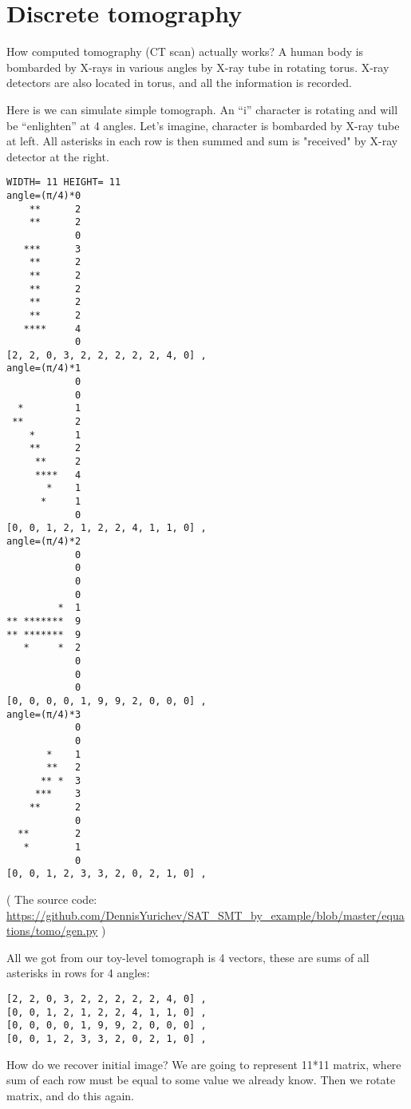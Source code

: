 \section{Discrete tomography}

How computed tomography (CT scan) actually works?
A human body is bombarded by X-rays in various angles by X-ray tube in rotating torus.
X-ray detectors are also located in torus, and all the information is recorded.

Here is we can simulate simple tomograph.
An ``i'' character is rotating and will be ``enlighten'' at 4 angles.
Let's imagine, character is bombarded by X-ray tube at left.
All asterisks in each row is then summed and sum is "received" by X-ray detector at the right.

\begin{lstlisting}
WIDTH= 11 HEIGHT= 11
angle=(π/4)*0
    **      2
    **      2
            0
   ***      3
    **      2
    **      2
    **      2
    **      2
    **      2
   ****     4
            0
[2, 2, 0, 3, 2, 2, 2, 2, 2, 4, 0] ,
angle=(π/4)*1
            0
            0
  *         1
 **         2
    *       1
    **      2
     **     2
     ****   4
       *    1
      *     1
            0
[0, 0, 1, 2, 1, 2, 2, 4, 1, 1, 0] ,
angle=(π/4)*2
            0
            0
            0
            0
         *  1
** *******  9
** *******  9
   *     *  2
            0
            0
            0
[0, 0, 0, 0, 1, 9, 9, 2, 0, 0, 0] ,
angle=(π/4)*3
            0
            0
       *    1
       **   2
      ** *  3
     ***    3
    **      2
            0
  **        2
   *        1
            0
[0, 0, 1, 2, 3, 3, 2, 0, 2, 1, 0] ,
\end{lstlisting}

( The source code: \url{https://github.com/DennisYurichev/SAT_SMT_by_example/blob/master/equations/tomo/gen.py} )

All we got from our toy-level tomograph is 4 vectors, these are sums of all asterisks in rows for 4 angles:

\begin{lstlisting}
[2, 2, 0, 3, 2, 2, 2, 2, 2, 4, 0] ,
[0, 0, 1, 2, 1, 2, 2, 4, 1, 1, 0] ,
[0, 0, 0, 0, 1, 9, 9, 2, 0, 0, 0] ,
[0, 0, 1, 2, 3, 3, 2, 0, 2, 1, 0] ,
\end{lstlisting}

How do we recover initial image?
We are going to represent 11*11 matrix, where sum of each row must be equal to some value we already know.
Then we rotate matrix, and do this again.

